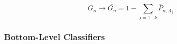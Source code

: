 \begin{equation}
    G_n \xrightarrow{}    \bar{G_n} = 1 - \sum_{j=1 \dotsc k} \bar{P}_{n,A_j}
\end{equation}


\subsubsection{Bottom-Level Classifiers}

